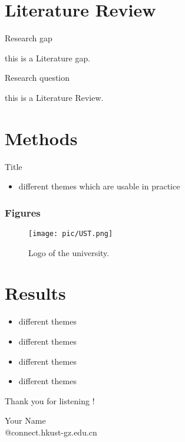 \documentclass[serif, aspectratio=169]{beamer}
\begin{document}
\section{Literature Review}
\begin{frame}{Research gap}

   this is a Literature gap.

\end{frame}

\begin{frame}{Research question}

   this is a Literature Review.

\end{frame}

\section{Methods}
\begin{frame}{Title}
    \begin{itemize}
        \item different themes which are usable in practice
    \end{itemize}
\end{frame}

\begin{frame}
	\frametitle<presentation>{Figures}
	\begin{figure}
		\centering
			\texttt{[image: pic/UST.png]}
		\caption{Logo of the university.}
		\label{fig:unilogo}
	\end{figure}
\end{frame}


\section{Results}
\begin{frame}
    \begin{itemize}
        \item different themes
        \item different themes
        \item different themes
        \item different themes
    \end{itemize}
\end{frame}


\begin{frame}
\begin{center}
{ Thank you for listening !}
\vspace{1cm}

Your Name \\[1em]
@connect.hkust-gz.edu.cn 
\end{center}
\end{frame}
\end{document}
